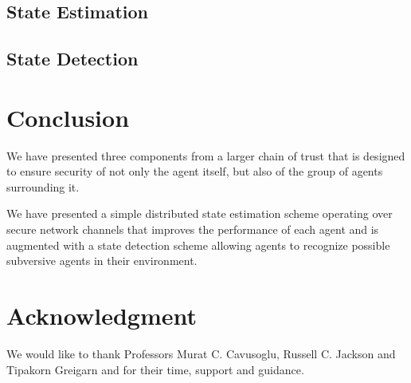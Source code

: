 \documentclass[conference]{IEEEtran}
\begin{document}
\subsection{State Estimation}



\subsection{State Detection}



\section{Conclusion} \label{Conclusion}
We have presented three components from a larger chain of trust that is designed to ensure security of not only the agent itself, but also of the group of agents surrounding it.

We have presented a simple distributed state estimation scheme operating over secure network channels that improves the performance of each agent and is augmented with a state detection scheme allowing agents to recognize possible subversive agents in their environment.

\section*{Acknowledgment}
We would like to thank Professors Murat C. Cavusoglu, Russell C. Jackson and Tipakorn Greigarn and for their time, support and guidance.

\printbibliography
\end{document}
